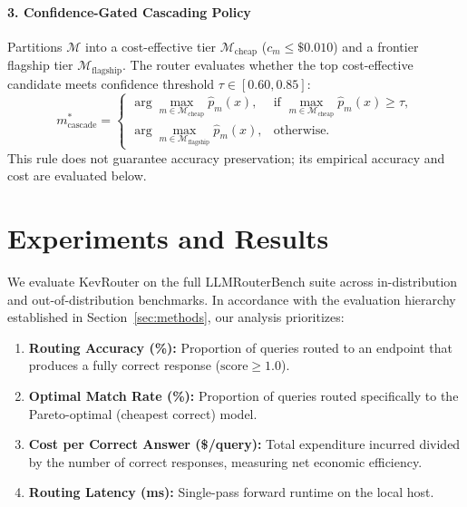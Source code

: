 \documentclass[11pt,a4paper]{article}
\begin{document}
\paragraph{3. Confidence-Gated Cascading Policy}
Partitions $\mathcal{M}$ into a cost-effective tier $\mathcal{M}_{\text{cheap}}$ ($c_m \le \$0.010$) and a frontier flagship tier $\mathcal{M}_{\text{flagship}}$. The router evaluates whether the top cost-effective candidate meets confidence threshold $\tau \in [0.60, 0.85]$:
\begin{equation}
m^*_{\text{cascade}} = \begin{cases} 
\arg\max_{m \in \mathcal{M}_{\text{cheap}}} \hat{p}_m(x), & \text{if } \max_{m \in \mathcal{M}_{\text{cheap}}} \hat{p}_m(x) \ge \tau, \\
\arg\max_{m \in \mathcal{M}_{\text{flagship}}} \hat{p}_m(x), & \text{otherwise.}
\end{cases}
\end{equation}
This rule does not guarantee accuracy preservation; its empirical accuracy and cost are evaluated below.

\section{Experiments and Results}
\label{sec:experiments}

We evaluate KevRouter on the full LLMRouterBench suite across in-distribution and out-of-distribution benchmarks. In accordance with the evaluation hierarchy established in Section~\ref{sec:methods}, our analysis prioritizes:
\begin{enumerate}
    \item \textbf{Routing Accuracy (\%):} Proportion of queries routed to an endpoint that produces a fully correct response ($\text{score} \ge 1.0$).
    \item \textbf{Optimal Match Rate (\%):} Proportion of queries routed specifically to the Pareto-optimal (cheapest correct) model.
    \item \textbf{Cost per Correct Answer (\$/query):} Total expenditure incurred divided by the number of correct responses, measuring net economic efficiency.
    \item \textbf{Routing Latency (ms):} Single-pass forward runtime on the local host.
\end{enumerate}
\end{document}
